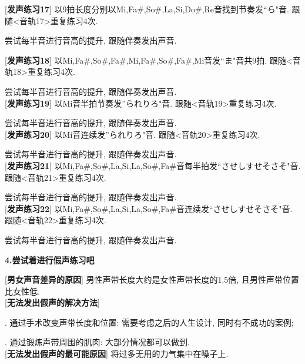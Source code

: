 [\textbf{发声练习17}] 以9拍长度分别以Mi,Fa\#,So\#,La,Si,Do\#,Re音找到节奏发``ら"音. 跟随<音轨17>重复练习4次.\par
\qquad 尝试每半音进行音高的提升, 跟随伴奏发出声音.\\

\clearpage

[\textbf{发声练习18}] 以Mi,Fa\#,So\#,Fa\#,Mi,Fa\#,So\#,Fa\#,Mi音发``ま"音共9拍. 跟随<音轨18>重复练习4次.\par
\qquad 尝试每半音进行音高的提升, 跟随伴奏发出声音.\\

[\textbf{发声练习19}] 以Mi音半拍节奏发''られりろ"音. 跟随<音轨19>重复练习4次.\par
\qquad 尝试每半音进行音高的提升, 跟随伴奏发出声音.\\

[\textbf{发声练习20}] 以Mi音连续发''られりろ"音. 跟随<音轨20>重复练习4次.\par
\qquad 尝试每半音进行音高的提升, 跟随伴奏发出声音.\\

[\textbf{发声练习21}] 以Mi,Fa\#,So\#,La,Si,La,So\#,Fa\#音每半拍发``させしすせそさそ"音. 跟随<音轨21>重复练习4次.\par
\qquad 尝试每半音进行音高的提升, 跟随伴奏发出声音.\\

[\textbf{发声练习22}] 以Mi,Fa\#,So\#,La,Si,La,So\#,Fa\#音连续发``させしすせそさそ"音. 跟随<音轨22>重复练习4次.\par
\qquad 尝试每半音进行音高的提升, 跟随伴奏发出声音.\\

\clearpage

\begin{center}
 \textbf{4.尝试着进行假声练习吧}
\end{center}

[\textbf{男女声音差异的原因}] 男性声带长度大约是女性声带长度的1.5倍, 且男性声带位置比女性低.\\

[\textbf{无法发出假声的解决方法}]\par
{}. 通过手术改变声带长度和位置: 需要考虑之后的人生设计, 同时有不成功的案例;\par
{}. 通过锻炼声带周围的肌肉: 大部分情况都可以做到.\\

[\textbf{无法发出假声的最可能原因}] 将过多无用的力气集中在嗓子上.\\


